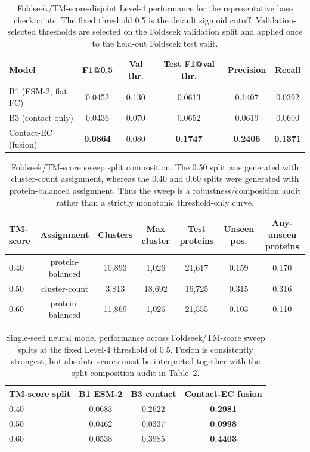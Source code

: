 \documentclass[11pt,a4paper]{article}
\begin{document}
\begin{table}[htbp]
\centering
\caption{Foldseek/TM-score-disjoint Level-4 performance for the representative
base checkpoints. The fixed threshold 0.5 is the default sigmoid cutoff.
Validation-selected thresholds are selected on the Foldseek validation split and
applied once to the held-out Foldseek test split.}
\label{tab:foldseek_threshold}
\small
\setlength{\tabcolsep}{4pt}
\begin{tabular}{lccccc}
\toprule
Model & F1@0.5 & Val thr. & Test F1@val thr. & Precision & Recall \\
\midrule
B1 (ESM-2, flat FC) & 0.0452 & 0.130 & 0.0613 & 0.1407 & 0.0392 \\
B3 (contact only) & 0.0436 & 0.070 & 0.0652 & 0.0619 & 0.0690 \\
Contact-EC (fusion) & \textbf{0.0864} & 0.080 & \textbf{0.1747} & \textbf{0.2406} & \textbf{0.1371} \\
\bottomrule
\end{tabular}
\end{table}

\begin{table}[htbp]
\centering
\caption{Foldseek/TM-score sweep split composition. The 0.50 split was generated
with cluster-count assignment, whereas the 0.40 and 0.60 splits were generated
with protein-balanced assignment. Thus the sweep is a robustness/composition
audit rather than a strictly monotonic threshold-only curve.}
\label{tab:foldseek_sweep_composition}
\small
\setlength{\tabcolsep}{4pt}
\begin{tabular}{lcccccc}
\toprule
TM-score & Assignment & Clusters & Max cluster & Test proteins & Unseen pos. & Any-unseen proteins \\
\midrule
0.40 & protein-balanced & 10{,}893 & 1{,}026 & 21{,}617 & 0.159 & 0.170 \\
0.50 & cluster-count & 3{,}813 & 18{,}692 & 16{,}725 & 0.315 & 0.316 \\
0.60 & protein-balanced & 11{,}869 & 1{,}026 & 21{,}555 & 0.103 & 0.110 \\
\bottomrule
\end{tabular}
\end{table}

\begin{table}[htbp]
\centering
\caption{Single-seed neural model performance across Foldseek/TM-score sweep
splits at the fixed Level-4 threshold of 0.5. Fusion is consistently strongest,
but absolute scores must be interpreted together with the split-composition
audit in Table~\ref{tab:foldseek_sweep_composition}.}
\label{tab:foldseek_sweep_neural}
\small
\setlength{\tabcolsep}{4pt}
\begin{tabular}{lccc}
\toprule
TM-score split & B1 ESM-2 & B3 contact & Contact-EC fusion \\
\midrule
0.40 & 0.0683 & 0.2622 & \textbf{0.2981} \\
0.50 & 0.0462 & 0.0337 & \textbf{0.0998} \\
0.60 & 0.0538 & 0.3985 & \textbf{0.4403} \\
\bottomrule
\end{tabular}
\end{table}
\end{document}
